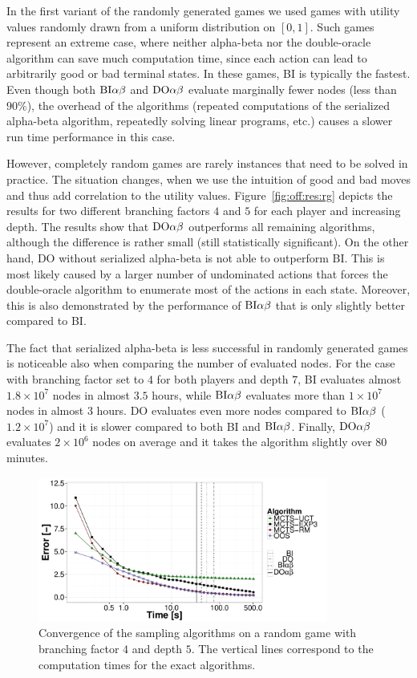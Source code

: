 In the first variant of the randomly generated games we used games with utility values randomly drawn from a uniform distribution on $[0,1]$.
Such games represent an extreme case, where neither alpha-beta nor the double-oracle algorithm can save much computation time, since each action can lead to arbitrarily good or bad terminal states.
In these games, \textsc{BI} is typically the fastest.
Even though both $\textrm{BI}\alpha\beta$ and $\textrm{DO}\alpha\beta$ evaluate marginally fewer nodes (less than $90\%$), the overhead of the algorithms (repeated computations of the serialized alpha-beta algorithm, repeatedly solving linear programs, etc.) causes a slower run time performance in this case.

However, completely random games are rarely instances that need to be solved in practice.
The situation changes, when we use the intuition of good and bad moves and thus add correlation to the utility values.
Figure~\ref{fig:off:res:rg} depicts the results for two different branching factors $4$ and $5$ for each player and increasing depth.
The results show that $\textrm{DO}\alpha\beta$ outperforms all remaining algorithms, although the difference is rather small (still statistically significant).
On the other hand, \textsc{DO} without serialized alpha-beta is not able to outperform \textsc{BI}.
This is most likely caused by a larger number of undominated actions that forces the double-oracle algorithm to enumerate most of the actions in each state.
Moreover, this is also demonstrated by the performance of $\textrm{BI}\alpha\beta$ that is only slightly better compared to \textsc{BI}.

The fact that serialized alpha-beta is less successful in randomly generated games is noticeable also when comparing the number of evaluated nodes.
For the case with branching factor set to $4$ for both players and depth $7$, \textsc{BI} evaluates almost $1.8\times10^7$ nodes in almost $3.5$ hours, while $\textrm{BI}\alpha\beta$ evaluates more than $1\times10^7$ nodes in almost $3$ hours.
\textsc{DO} evaluates even more nodes compared to $\textrm{BI}\alpha\beta$ ($1.2\times10^7$) and it is slower compared to both \textsc{BI} and $\textrm{BI}\alpha\beta$.
Finally, $\textrm{DO}\alpha\beta$ evaluates $2\times10^6$ nodes on average and it takes the algorithm slightly over $80$ minutes. 

\begin{figure}[t!]
\centering
\includegraphics[width=0.85\textwidth]{figures/convergence-rg.pdf}
\caption{Convergence of the sampling algorithms on a random game with branching factor $4$ and depth $5$. The vertical lines correspond to the computation times for the exact algorithms.} \label{fig:off:conv:rg}
\end{figure}


